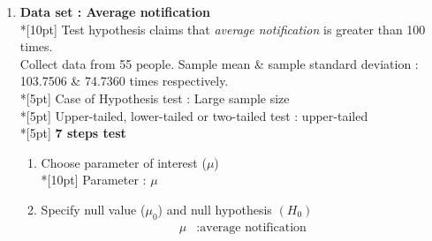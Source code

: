 \begin{enumerate}
\begin{enumerate}[label=1.\arabic*]
            \begin{equation*}
                \alpha &: 0.05
            \end{equation*}
            \begin{equation}
                \begin{align}
                    1-\alpha &= 1-0.05 &&= 0.95\\
                    z_a &= z_{0.05} &&= 1.6449\\
                \end{align}
            \end{equation}
            \begin{equation*}
                z &\geq 1.6449
            \end{equation*}
            \item Determine whether we reject null hypothesis or not\\*[10pt]
                Test static does not fall inside the rejection region. Null hypothesis is not rejected.
            \item Conclude the problem\\*[10pt]
            We do not reject the null hypothesis. Average screen duration is 7 Hrs.
        \end{enumerate}
    \item \textbf{Data set : Average notification}\\*[10pt]
        Test hypothesis claims that \textit{average notification} is greater than 100 times.\\
        Collect data from 55 people. Sample mean & sample standard deviation : 103.7506 \& 74.7360 times respectively.\\*[5pt]
        Case of Hypothesis test : Large sample size\\*[5pt]
        Upper-tailed, lower-tailed or two-tailed test : upper-tailed\\*[5pt]
        \textbf{7 steps test}
        \begin{enumerate}[label=2.\arabic*]
            \item Choose parameter of interest (\(\mu\))\\*[10pt]
                Parameter : \(\mu\)
            \item Specify null value (\(\mu_0\)) and null hypothesis \((H_0)\)\\
            \begin{equation}
                \begin{split}
                    \mu &: \textrm{average notification}\\

\end{split}
\end{equation}
\end{enumerate}
\end{enumerate}
